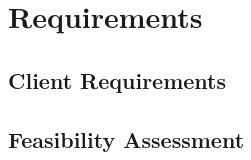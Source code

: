 \chapter{Requirements}
\label{chapter3}

\section{Client Requirements}
\lipsum[1-1] \cite{parikh1980adaptive}

\section{Feasibility Assessment}
\lipsum[1-1] \cite{parikh1980adaptive}
